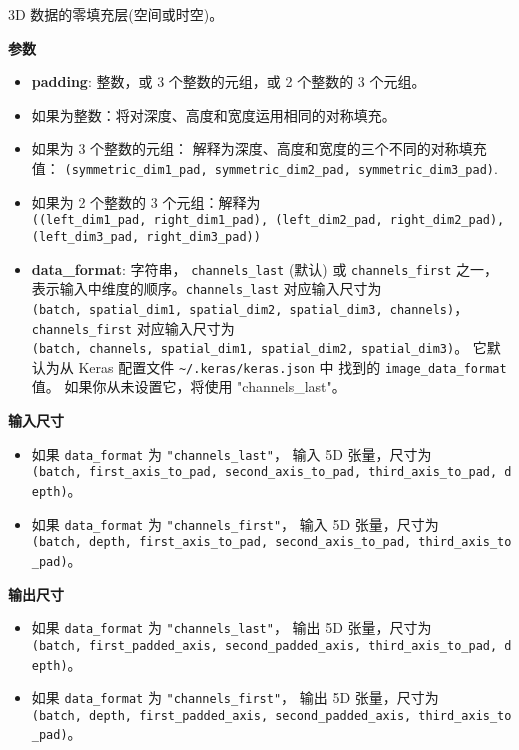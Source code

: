 \begin{Shaded}
\begin{Highlighting}[]
\OperatorTok{=}\NormalTok{(}\NormalTok{, }\NormalTok{, }\OperatorTok{=}\NormalTok{)}
\end{Highlighting}
\end{Shaded}

3D 数据的零填充层(空间或时空)。

\textbf{参数}

\begin{itemize}
\tightlist
\item
  \textbf{padding}: 整数，或 3 个整数的元组，或 2 个整数的 3 个元组。
\item
  如果为整数：将对深度、高度和宽度运用相同的对称填充。
\item
  如果为 3 个整数的元组： 解释为深度、高度和宽度的三个不同的对称填充值：
  \texttt{(symmetric\_dim1\_pad,\ symmetric\_dim2\_pad,\ symmetric\_dim3\_pad)}.
\item
  如果为 2 个整数的 3 个元组：解释为
  \texttt{((left\_dim1\_pad,\ right\_dim1\_pad),\ (left\_dim2\_pad,\ right\_dim2\_pad),\ (left\_dim3\_pad,\ right\_dim3\_pad))}
\item
  \textbf{data\_format}: 字符串， \texttt{channels\_last} (默认) 或
  \texttt{channels\_first} 之一，
  表示输入中维度的顺序。\texttt{channels\_last} 对应输入尺寸为
  \texttt{(batch,\ spatial\_dim1,\ spatial\_dim2,\ spatial\_dim3,\ channels)}，
  \texttt{channels\_first} 对应输入尺寸为
  \texttt{(batch,\ channels,\ spatial\_dim1,\ spatial\_dim2,\ spatial\_dim3)}。
  它默认为从 Keras 配置文件 \texttt{\textasciitilde{}/.keras/keras.json}
  中 找到的 \texttt{image\_data\_format} 值。 如果你从未设置它，将使用
  "channels\_last"。
\end{itemize}

\textbf{输入尺寸}

\begin{itemize}
\tightlist
\item
  如果 \texttt{data\_format} 为 \texttt{"channels\_last"}， 输入 5D
  张量，尺寸为
  \texttt{(batch,\ first\_axis\_to\_pad,\ second\_axis\_to\_pad,\ third\_axis\_to\_pad,\ depth)}。
\item
  如果 \texttt{data\_format} 为 \texttt{"channels\_first"}， 输入 5D
  张量，尺寸为
  \texttt{(batch,\ depth,\ first\_axis\_to\_pad,\ second\_axis\_to\_pad,\ third\_axis\_to\_pad)}。
\end{itemize}

\textbf{输出尺寸}

\begin{itemize}
\tightlist
\item
  如果 \texttt{data\_format} 为 \texttt{"channels\_last"}， 输出 5D
  张量，尺寸为
  \texttt{(batch,\ first\_padded\_axis,\ second\_padded\_axis,\ third\_axis\_to\_pad,\ depth)}。
\item
  如果 \texttt{data\_format} 为 \texttt{"channels\_first"}， 输出 5D
  张量，尺寸为
  \texttt{(batch,\ depth,\ first\_padded\_axis,\ second\_padded\_axis,\ third\_axis\_to\_pad)}。
\end{itemize}

\newpage